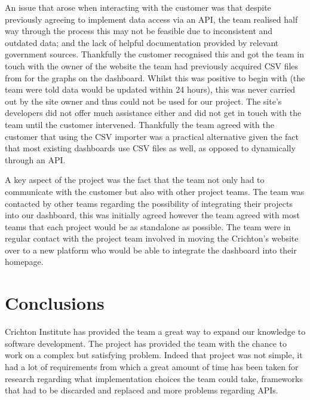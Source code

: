 \documentclass{l3proj}
\begin{document}
An issue that arose when interacting with the customer was that despite previously agreeing to implement data access
via an API, the team realised half way through the process this may not be feasible due to inconsistent and outdated
data; and the lack of helpful documentation provided by relevant government sources. Thankfully the customer recognised
this and got the team in touch with the owner of the website the team had previously acquired CSV files from for the graphs on
the dashboard. Whilst this was positive to begin with (the team were told data would be updated within 24 hours), this was
never carried out by the site owner and thus could not be used for our project. The site's developers did not offer much
assistance either and did not get in touch with the team until the customer intervened. Thankfully the team agreed with
the customer that using the CSV importer was a practical alternative given the fact that most existing dashboards use
CSV files as well, as opposed to dynamically through an API.

A key aspect of the project was the fact that the team not only had to communicate with the customer but also with
other project teams. The team was contacted by other teams regarding the possibility of integrating their projects into
our dashboard, this was initially agreed however the team agreed with most teams that each project would be as standalone as
possible. The team were in regular contact with the project team involved in moving the Crichton's website over to a
new platform who would be able to integrate the dashboard into their homepage.


\section{Conclusions}
\label{sec:conclusions}


Crichton Institute has provided the team a great way to expand our knowledge to software development. The project has
provided the team with the chance to work on a complex but satisfying problem. Indeed that project was not simple,
it had a lot of requirements from which a great amount of time has been taken for research regarding what implementation
choices the team could take, frameworks that had to be discarded and replaced and more problems regarding APIs.
\end{document}
